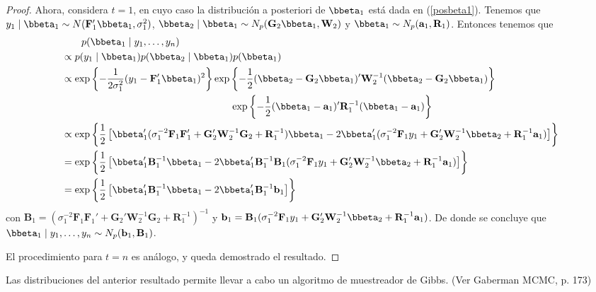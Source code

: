 \begin{proof}
Ahora, considera $t=1$, en cuyo caso la distribución a posteriori de $\bbeta_1$ está dada en (\ref{posbeta1}). Tenemos que $y_1 \mid \bbeta_1\sim N(\mathbf{F}_1'\bbeta_1,\sigma_1^2)$, $\bbeta_2 \mid \bbeta_1\sim N_p(\mathbf{G}_2\bbeta_1,\mathbf{W}_2)$ y $\bbeta_1\sim N_p(\mathbf{a}_1,\mathbf{R}_1)$. Entonces tenemos que
\begin{align*}
&\ \ \ \ \ \ p(\bbeta_1 \mid y_1,\ldots,y_n)\\
&\propto p(y_1 \mid \bbeta_1)p(\bbeta_2 \mid \bbeta_1)p(\bbeta_1)\\
&\propto \exp\left\{-\frac{1}{2\sigma_1^2}(y_1-\mathbf{F}_1'\bbeta_1)^2\right\}\exp\left\{-\frac{1}{2}(\bbeta_2-\mathbf{G}_2\bbeta_1)'\mathbf{W}_2^{-1}(\bbeta_2-\mathbf{G}_2\bbeta_1)\right\}\\
&\hspace{6cm}\exp\left\{-\frac{1}{2}(\bbeta_1-\mathbf{a}_1)'\mathbf{R}_1^{-1}(\bbeta_1-\mathbf{a}_1)\right\}\\
&\propto \exp\left\{\frac{1}{2}\left[\bbeta_1'(\sigma^{-2}_1\mathbf{F}_1\mathbf{F}_1'+\mathbf{G}_2'\mathbf{W}_2^{-1}\mathbf{G}_2+\mathbf{R}_1^{-1})\bbeta_1-2\bbeta_1'(\sigma^{-2}_1\mathbf{F}_1y_1+\mathbf{G}_2'\mathbf{W}_2^{-1}\bbeta_2+\mathbf{R}_1^{-1}\mathbf{a}_1)\right]\right\}\\
&=\exp\left\{\frac{1}{2}\left[\bbeta_1'\mathbf{B}_1^{-1}\bbeta_1-2\bbeta_1'\mathbf{B}_1^{-1}\mathbf{B}_1(\sigma^{-2}_1\mathbf{F}_1y_1+\mathbf{G}_2'\mathbf{W}_2^{-1}\bbeta_2+\mathbf{R}_1^{-1}\mathbf{a}_1)\right]\right\}\\
&=\exp\left\{\frac{1}{2}\left[\bbeta_1'\mathbf{B}_1^{-1}\bbeta_1-2\bbeta_1'\mathbf{B}_1^{-1}\mathbf{b}_1\right]\right\}\\
\end{align*}
con $\mathbf{B}_1=(\sigma^{-2}_1\mathbf{F}_1\mathbf{F}_1'+\mathbf{G}_2'\mathbf{W}_2^{-1}\mathbf{G}_2+\mathbf{R}_1^{-1})^{-1}$ y $\mathbf{b}_1=\mathbf{B}_1(\sigma^{-2}_1\mathbf{F}_1y_1+\mathbf{G}_2'\mathbf{W}_2^{-1}\bbeta_2+\mathbf{R}_1^{-1}\mathbf{a}_1)$. De donde se concluye que $\bbeta_1 \mid y_1,\ldots,y_n\sim N_p(\mathbf{b}_1,\mathbf{B}_1)$.

El procedimiento para $t=n$ es análogo, y queda demostrado el resultado.
\end{proof}
Las distribuciones del anterior resultado permite llevar a cabo un algoritmo de muestreador de Gibbs. (Ver Gaberman MCMC, p. 173)

